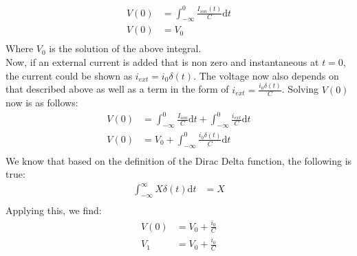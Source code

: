 \documentclass[10pt]{report}
\begin{document}
\begin{enumerate}
\begin{align*}
V(0) &= \int_{-\infty}^0 \frac{I_{ion}(t)}{C} \mathrm{d}t \\
V(0) &= V_0 \\
\end{align*}
Where $V_0$ is the solution of the above integral. \\
Now, if an external current is added that is non zero and instantaneous at $t=0$, the current could be shown as $i_{ext} = i_0 \delta(t)$. The voltage now also depends on that described above as well as a term in the form of $i_{ext} = \frac{i_0 \delta(t)}{C}$. Solving $V(0)$ now is as follows: \\
\begin{align*}
V(0) &= \int_{-\infty}^0 \frac{I_{ion}}{C} \mathrm{d}t + \int_{-\infty}^0 \frac{i_{ext}}{C} \mathrm{d}t \\
V(0) &= V_0 + \int_{-\infty}^0 \frac{i_0 \delta(t)}{C} \mathrm{d}t \\
\end{align*}
We know that based on the definition of the Dirac Delta function, the following is true:
\begin{align*}
\int_{-\infty}^{\infty} X \delta (t) \mathrm{d}t &= X \\
\end{align*}
Applying this, we find:
\begin{align*}
V(0) &= V_0 + \frac{i_0}{C} \\
V_1 & = V_0 + \frac{i_0}{C} \\
\end{align*}
%
%

\end{enumerate}
\end{document}
